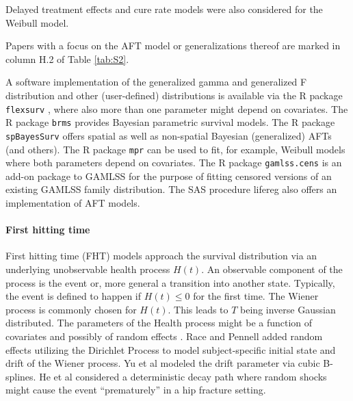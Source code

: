 \noindent Delayed treatment effects \cite{Yoshida.2016} and cure rate models \cite{Hasegawa.2016} were also considered for the Weibull model.

\noindent Papers with a focus on the AFT model or generalizations thereof are marked in column H.2 of Table \ref{tab:S2}.


\noindent A software implementation of the generalized gamma and generalized F distribution and other (user-defined) distributions is available via the R package \texttt{flexsurv} \cite{Jackson.2021}, where also more than one parameter might depend on covariates. The R package \texttt{brms} provides Bayesian parametric survival models. The R package \texttt{spBayesSurv} offers spatial as well as non-spatial Bayesian (generalized) AFTs (and others). The R package \texttt{mpr} can be used to fit, for example, Weibull models where both parameters depend on covariates. The R package \texttt{gamlss.cens} is an add-on package to GAMLSS for the purpose of fitting censored versions of an existing GAMLSS family distribution. The SAS procedure lifereg also offers an implementation of AFT models.

\noindent 


\paragraph{First hitting time} \label{FHT}

\noindent 


\noindent First hitting time (FHT) models approach the survival distribution via an underlying unobservable health process $H(t)$. An observable component of the process is the event or, more general a transition into another state. Typically, the event is defined to happen if $H\left(t\right)\le 0$ for the first time. The Wiener process is commonly chosen for $H(t)$. This leads to $T$ being inverse Gaussian distributed. The parameters of the Health process might be a function of covariates and possibly of random effects \cite{Pennell.2010}. Race and Pennell \cite{Race.2021} added random effects utilizing the Dirichlet Process to model subject-specific initial state and drift of the Wiener process. Yu et al \cite{Yu.2009} modeled the drift parameter via cubic B-splines. He et al \cite{He.2015} considered a deterministic decay path where random shocks might cause the event ``prematurely'' in a hip fracture setting. 

